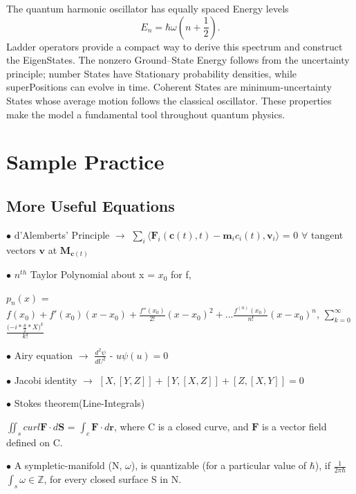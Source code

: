 \documentclass[a4paper, 10pt, onepage]{elegantbook}
\begin{document}
{The quantum harmonic oscillator has equally spaced Energy levels
\begin{equation}
  E_n=\hbar\omega\left(n+\frac{1}{2}\right).
\end{equation}
Ladder operators provide a compact way to derive this spectrum and
construct the EigenStates. The nonzero Ground--State Energy follows
from the uncertainty principle; number States have Stationary
probability densities, while superPositions can evolve in time.
Coherent States are minimum-uncertainty States whose average motion
follows the classical oscillator. These properties make the model a
fundamental tool throughout quantum physics.


\noindent

\chapter{Sample Practice}

\section{More Useful Equations}

$\bullet$  d'Alemberts' Principle $\longrightarrow$  $\sum_i \langle \mathbf {F}_i(\mathbf c(t),t) - \mathbf {m}_i 
{c_i(t)}, \mathbf {v}_{i} \rangle$ = 0 $\forall$ tangent vectors $\mathbf v$ at $\mathbf {M}_{\mathbf c(t)}$  

$\bullet$  $n^{th}$ Taylor Polynomial about x = $x_0$ for f,  

$p_n(x)$ = $f(x_0) + f'(x_0)(x - x_0) + \frac{f''(x_0)}{2!}(x - x_0)^2 +...\frac{f^{(n)}{(x_0)}}{n!}(x - x_0)^n $,  
$\sum_{k=0}^\infty$ $\frac{ ({-i} * {\frac{\theta}{2} * {X} )^k}} {k!}$  

$\bullet$ Airy equation $\longrightarrow$ $\frac{d^2 \psi} {dU^2}$ - $u \psi (u) = 0$  

$\bullet$ Jacobi identity $\longrightarrow$ $[X,[Y,Z]] + [Y,[X,Z]] + [Z, [X,Y]] = 0$  

$\bullet$ Stokes theorem(Line-Integrals)  

$\iint_s curl \mathbf F \cdot d \mathbf S$ = $\int_c \mathbf F \cdot d \mathbf r$, where C is a closed curve, and 
$\mathbf F$ is a vector field defined on C. 

$\bullet$ A sympletic-manifold (N, $\omega$), is quantizable (for a particular value of 
$\hbar$), if
$\frac{1}{{2 \pi \hbar}}$ $\int_s \omega \in \mathbb Z$, for every closed surface S in N.  

}
\end{document}
